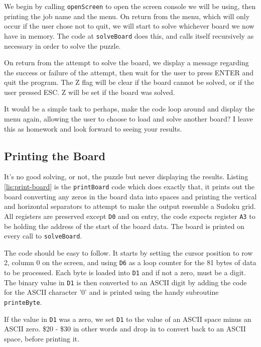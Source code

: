 We begin by calling \texttt{openScreen} to open the screen console
we will be using, then printing the job name and the menu. On return
from the menu, which will only occur if the user chose not to quit,
we will start to solve whichever board we now have in memory. The
code at \texttt{solveBoard} does this, and calls itself recursively
as necessary in order to solve the puzzle.



On return from the attempt to solve the board, we display a message
regarding the success or failure of the attempt, then wait for the
user to press ENTER and quit the program. The Z flag will be clear
if the board cannot be solved, or if the user pressed ESC. Z will
be set if the board was solved.

It would be a simple task to perhaps, make the code loop around and
display the menu again, allowing the user to choose to load and solve
another board? I leave this as homework and look forward to seeing
your results.

\subsection{Printing the Board}

It's no good solving, or not, the puzzle but never displaying the
results. Listing \ref{lis:print-board} is the \texttt{printBoard}
code which does exactly that, it prints out the board converting any
zeros in the board data into spaces and printing the vertical and
horizontal separators to attempt to make the output resemble a Sudoku
grid. All registers are preserved except \texttt{D0} and on entry,
the code expects register \texttt{A3} to be holding the address of
the start of the board data. The board is printed on every call to
\texttt{solveBoard}.

The code should be easy to follow. It starts by setting the cursor
position to row 2, column 0 on the screen, and using \texttt{D6} as
a loop counter for the 81 bytes of data to be processed. Each byte
is loaded into \texttt{D1} and if not a zero, must be a digit. The
binary value in \texttt{D1} is then converted to an ASCII digit by
adding the code for the ASCII character '0' and is printed using the
handy subroutine \texttt{printeByte}.

If the value in \texttt{D1} was a zero, we set \texttt{D1} to the
value of an ASCII space minus an ASCII zero. \$20 - \$30 in other
words and drop in to convert back to an ASCII space, before printing
it.

